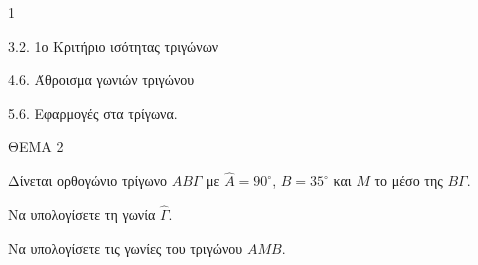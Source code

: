 \begin{ylh}{1}
    \item 3.2. 1ο Κριτήριο ισότητας τριγώνων
    \item 4.6. Άθροισμα γωνιών τριγώνου
    \item 5.6. Εφαρμογές στα τρίγωνα.
\end{ylh}

ΘΕΜΑ 2

Δίνεται ορθογώνιο τρίγωνο $AB\Gamma$ με $\widehat{A} = 90^{\circ}$, $\widehat{B} = 35^{\circ}$ και $M$ το μέσο της $B\Gamma$.

\begin{alist}
\item Να υπολογίσετε τη γωνία $\widehat{\Gamma}$. 
\item Να υπολογίσετε τις γωνίες του τριγώνου $AMB$. 

\begin{center}
\end{center}
\end{alist}
